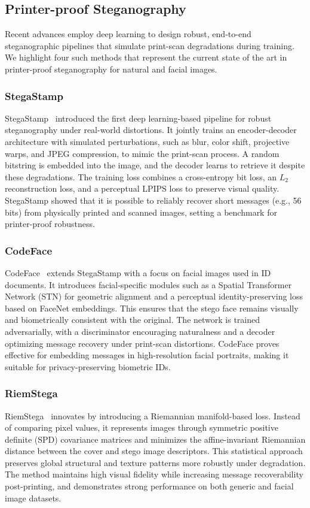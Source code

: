 \subsection{Printer-proof Steganography}\label{sec:printer_proof_steganography}
Recent advances employ deep learning to design robust, end-to-end steganographic pipelines that simulate print-scan degradations during training. We highlight four such methods that represent the current state of the art in printer-proof steganography for natural and facial images.

\subsubsection{StegaStamp}
StegaStamp~\cite{stegastamp2020} introduced the first deep learning-based pipeline for robust steganography under real-world distortions. It jointly trains an encoder-decoder architecture with simulated perturbations, such as blur, color shift, projective warps, and JPEG compression, to mimic the print-scan process. A random bitstring is embedded into the image, and the decoder learns to retrieve it despite these degradations. The training loss combines a cross-entropy bit loss, an $L_2$ reconstruction loss, and a perceptual LPIPS loss to preserve visual quality. StegaStamp showed that it is possible to reliably recover short messages (e.g., 56 bits) from physically printed and scanned images, setting a benchmark for printer-proof robustness.

\subsubsection{CodeFace}
CodeFace~\cite{codeface2021} extends StegaStamp with a focus on facial images used in ID documents. It introduces facial-specific modules such as a Spatial Transformer Network (STN) for geometric alignment and a perceptual identity-preserving loss based on FaceNet embeddings. This ensures that the stego face remains visually and biometrically consistent with the original. The network is trained adversarially, with a discriminator encouraging naturalness and a decoder optimizing message recovery under print-scan distortions. CodeFace proves effective for embedding messages in high-resolution facial portraits, making it suitable for privacy-preserving biometric IDs.

\subsubsection{RiemStega}
RiemStega~\cite{cruz2025riemstega} innovates by introducing a Riemannian manifold-based loss. Instead of comparing pixel values, it represents images through symmetric positive definite (SPD) covariance matrices and minimizes the affine-invariant Riemannian distance between the cover and stego image descriptors. This statistical approach preserves global structural and texture patterns more robustly under degradation. The method maintains high visual fidelity while increasing message recoverability post-printing, and demonstrates strong performance on both generic and facial image datasets.


